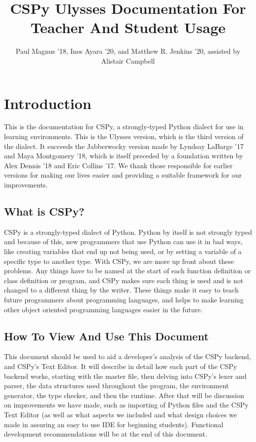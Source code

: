 \documentclass{article}
\begin{document}
\title{CSPy Ulysses Documentation For Teacher And Student Usage} 
\author{Paul Magnus '18, Ines Ayara '20, and Matthew R. Jenkins '20, assisted by Alistair Campbell}
\maketitle{}

\tableofcontents

\newpage

\section{Introduction}
This is the documentation for CSPy, a strongly-typed Python dialect for use in learning environments. This is the Ulysses version, which is the third version of the dialect. It succeeds the Jabberwocky version made by Lyndsay LaBarge '17 and Maya Montgomery '18, which is itself preceded by a foundation written by Alex Dennis '18 and Eric Collins '17. We thank those responsible for earlier versions for making our lives easier and providing a suitable framework for our improvements.

\subsection{What is CSPy?}
CSPy is a strongly-typed dialect of Python. Python by itself is not strongly typed and because of this, new programmers that use Python can use it in bad ways, like creating variables that end up not being used, or by setting a variable of a specific type to another type. With CSPy, we are more up front about these problems. Any things have to be named at the start of each function definition or class definition or program, and CSPy makes sure each thing is used and is not changed to a different thing by the writer. These things make it easy to teach future programmers about programming languages, and helps to make learning other object oriented programming languages easier in the future.

\subsection{How To View And Use This Document}
This document should be used to aid a developer's analysis of the CSPy backend, and CSPy's Text Editor. It will describe in detail how each part of the CSPy backend works, starting with the master file, then delving into CSPy's lexer and parser, the data structures used throughout the program, the environment generator, the type checker, and then the runtime. After that will be discussion on improvements we have made, such as importing of Python files and the CSPy Text Editor (as well as what aspects we included and what design choices we made in assuring an easy to use IDE for beginning students). Functional development recommendations will be at the end of this document. 
\end{document}
